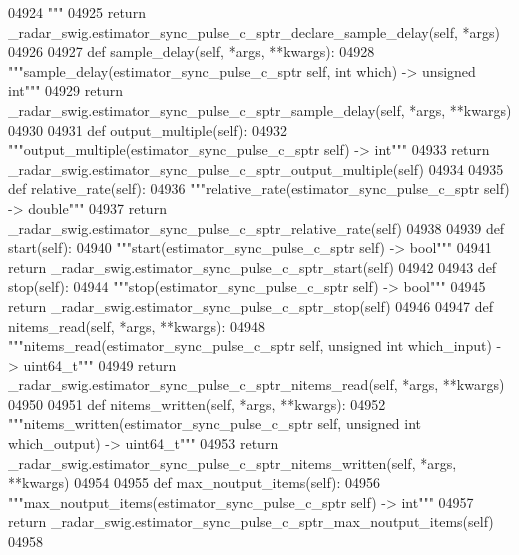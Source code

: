 \begin{DoxyCode}
{{{{{{{{{{{{{{{{{04924 \textcolor{stringliteral}{        """}
04925         \textcolor{keywordflow}{return} \_radar\_swig.estimator\_sync\_pulse\_c\_sptr\_declare\_sample\_delay(self, *args)
04926 
04927     \textcolor{keyword}{def }sample_delay(self, *args, **kwargs):
04928         \textcolor{stringliteral}{"""sample\_delay(estimator\_sync\_pulse\_c\_sptr self, int which) -> unsigned int"""}
04929         \textcolor{keywordflow}{return} \_radar\_swig.estimator\_sync\_pulse\_c\_sptr\_sample\_delay(self, *args, **kwargs)
04930 
04931     \textcolor{keyword}{def }output_multiple(self):
04932         \textcolor{stringliteral}{"""output\_multiple(estimator\_sync\_pulse\_c\_sptr self) -> int"""}
04933         \textcolor{keywordflow}{return} \_radar\_swig.estimator\_sync\_pulse\_c\_sptr\_output\_multiple(self)
04934 
04935     \textcolor{keyword}{def }relative_rate(self):
04936         \textcolor{stringliteral}{"""relative\_rate(estimator\_sync\_pulse\_c\_sptr self) -> double"""}
04937         \textcolor{keywordflow}{return} \_radar\_swig.estimator\_sync\_pulse\_c\_sptr\_relative\_rate(self)
04938 
04939     \textcolor{keyword}{def }start(self):
04940         \textcolor{stringliteral}{"""start(estimator\_sync\_pulse\_c\_sptr self) -> bool"""}
04941         \textcolor{keywordflow}{return} \_radar\_swig.estimator\_sync\_pulse\_c\_sptr\_start(self)
04942 
04943     \textcolor{keyword}{def }stop(self):
04944         \textcolor{stringliteral}{"""stop(estimator\_sync\_pulse\_c\_sptr self) -> bool"""}
04945         \textcolor{keywordflow}{return} \_radar\_swig.estimator\_sync\_pulse\_c\_sptr\_stop(self)
04946 
04947     \textcolor{keyword}{def }nitems_read(self, *args, **kwargs):
04948         \textcolor{stringliteral}{"""nitems\_read(estimator\_sync\_pulse\_c\_sptr self, unsigned int which\_input) -> uint64\_t"""}
04949         \textcolor{keywordflow}{return} \_radar\_swig.estimator\_sync\_pulse\_c\_sptr\_nitems\_read(self, *args, **kwargs)
04950 
04951     \textcolor{keyword}{def }nitems_written(self, *args, **kwargs):
04952         \textcolor{stringliteral}{"""nitems\_written(estimator\_sync\_pulse\_c\_sptr self, unsigned int which\_output) -> uint64\_t"""}
04953         \textcolor{keywordflow}{return} \_radar\_swig.estimator\_sync\_pulse\_c\_sptr\_nitems\_written(self, *args, **kwargs)
04954 
04955     \textcolor{keyword}{def }max_noutput_items(self):
04956         \textcolor{stringliteral}{"""max\_noutput\_items(estimator\_sync\_pulse\_c\_sptr self) -> int"""}
04957         \textcolor{keywordflow}{return} \_radar\_swig.estimator\_sync\_pulse\_c\_sptr\_max\_noutput\_items(self)
04958 
}}}}}}}}}}}}}}}}}
\end{DoxyCode}
